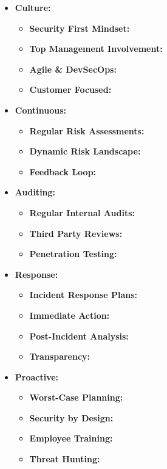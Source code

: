     \begin{itemize}
        \item \textbf{Culture:}
        \begin{itemize}
            \item \textbf{Security First Mindset:}
            \item \textbf{Top Management Involvement:}
            \item \textbf{Agile \& DevSecOps:}
            \item \textbf{Customer Focused:}
        \end{itemize}
        \item \textbf{Continuous:}
        \begin{itemize}
            \item \textbf{Regular Risk Assessments:}
            \item \textbf{Dynamic Risk Landscape:}
            \item \textbf{Feedback Loop:}
        \end{itemize}
        \item \textbf{Auditing:}
        \begin{itemize}
            \item \textbf{Regular Internal Audits:}
            \item \textbf{Third Party Reviews:}
            \item \textbf{Penetration Testing:}
        \end{itemize}
        \item \textbf{Response:}
        \begin{itemize}
            \item \textbf{Incident Response Plans:}
            \item \textbf{Immediate Action:}
            \item \textbf{Post-Incident Analysis:}
            \item \textbf{Transparency:}
        \end{itemize}
        \item \textbf{Proactive:}
        \begin{itemize}
            \item \textbf{Worst-Case Planning:}
            \item \textbf{Security by Design:}
            \item \textbf{Employee Training:}
            \item \textbf{Threat Hunting:}
        \end{itemize}
    \end{itemize}

